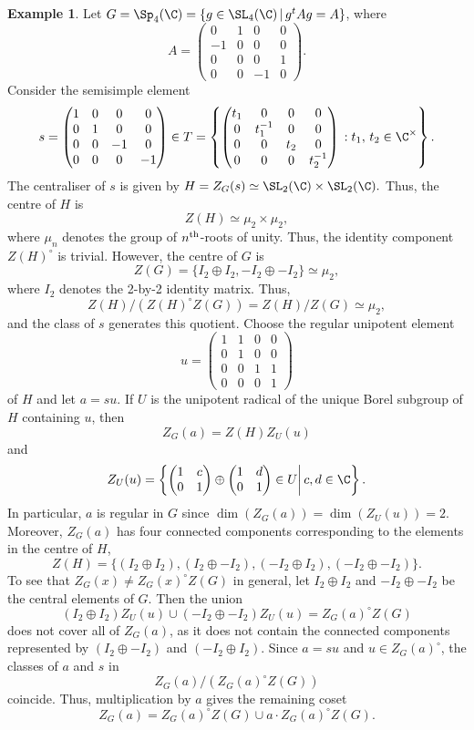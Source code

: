 \documentclass[12pt, a4paper, oneside]{amsart}
\theoremstyle{plain} %
\theoremstyle{definition} %
\newtheorem{example}[theorem]{Example}
\theoremstyle{remark} %
\begin{document}
\begin{example}
Let $G = \Sp_4(\C) = \{g\in \SL_4(\C)\,|\, g^tAg=A\}$, where 
\[A = \begin{pmatrix}
0&1&0&0\\ -1&0&0&0\\ 0&0&0&1\\0&0&-1&0
\end{pmatrix}.\] 
Consider the semisimple element
\[s = \begin{pmatrix}
1&0&0&0\\ 0&1&0&0\\ 0&0&-1&0\\0&0&0&-1
\end{pmatrix}\in T = \left\{\begin{pmatrix}
t_1&0&0&0\\ 0&t_1^{-1}&0&0\\ 0&0&t_2&0\\0&0&0&t_2^{-1}
\end{pmatrix}\,:t_1,\,t_2\in \C^\times\right\}.\]
The centraliser of $s$ is given by $H=Z_G(s) \simeq \SL_2(\C)\times \SL_2(\C).$
Thus, the centre of $H$ is
\[Z(H) \simeq \mu_2\times \mu_2,\]
where $\mu_n$ denotes the group of $n^{\rm th}$-roots of unity. Thus, the identity component $Z(H)^\circ$ is trivial. However, the centre of $G$ is
\[Z(G) = \{I_2\oplus I_2, -I_2\oplus -I_2\}\simeq \mu_2,\]
where $I_2$ denotes the 2-by-2 identity matrix. Thus,
\[
Z(H)/(Z(H)^\circ Z(G)) =Z(H)/Z(G) \simeq\mu_2,
\]
and the class of $s$ generates this quotient. Choose the regular unipotent element 
\[u =\begin{pmatrix}
1&1&0&0\\ 0&1&0&0\\ 0&0&1&1\\0&0&0&1
\end{pmatrix}\]
of $H$ and let $a=su$. If $U$ is the unipotent radical of the unique Borel subgroup of $H$ containing $u$, then
\[Z_G(a) = Z(H)Z_U(u)\]
and
\[Z_U(u) = \left\{\begin{pmatrix}1&c\\0&1\end{pmatrix}\oplus\begin{pmatrix}1&d\\0&1\end{pmatrix}\in U\bigg|\,c,d\in \C\right\}.\]
In particular, $a$ is regular in $G$ since $\dim (Z_G(a))=\dim (Z_U(u))=2$. Moreover, $Z_G(a)$ has four connected components corresponding to the elements in the centre of $H$,
\[Z(H) = \{(I_2\oplus I_2), (I_2\oplus -I_2),(-I_2\oplus I_2),(-I_2\oplus -I_2)\}.\]
To see that $Z_G(x)\neq Z_G(x)^\circ Z(G)$ in general, let $I_2\oplus I_2$ and $-I_2\oplus -I_2$ be the central elements of $G$. Then the union
\[(I_2\oplus I_2)Z_U(u)\cup (-I_2\oplus -I_2)Z_U(u) = Z_G(a)^\circ Z(G)\]
does not cover all of $Z_G(a)$, as it does not contain the connected components represented by $(I_2\oplus -I_2)$ and $ (-I_2\oplus I_2).$ Since $a=su$ and $u\in Z_G(a)^\circ$, the classes of $a$ and $s$ in
\[Z_G(a)/(Z_G(a)^\circ Z(G))\]
coincide. Thus, multiplication by $a$ gives the remaining coset 
\[ Z_G(a)=Z_G(a)^\circ Z(G)\cup a\cdot Z_G(a)^\circ Z(G).\]
\end{example}
\end{document}
